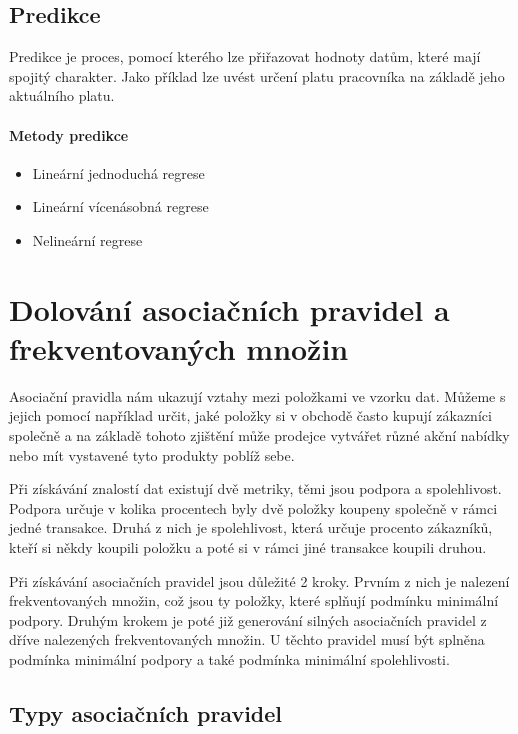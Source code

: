 \subsection{Predikce}
Predikce je proces, pomocí kterého lze přiřazovat hodnoty datům, které mají spojitý charakter. Jako příklad lze uvést určení platu pracovníka na základě jeho aktuálního platu. \cite[Kapitola~8]{Kamber}

\paragraph{Metody predikce} 

\begin{itemize}
  \item{Lineární jednoduchá regrese}
  \item{Lineární vícenásobná regrese}
  \item{Nelineární regrese}

\end{itemize}



\section{Dolování asociačních pravidel a frekventovaných množin}

Asociační pravidla nám ukazují vztahy mezi položkami ve vzorku dat. Můžeme s jejich pomocí například určit, jaké položky si v obchodě často kupují zákazníci společně a na základě tohoto zjištění může prodejce vytvářet různé akční nabídky nebo mít vystavené tyto produkty poblíž sebe.



Při získávání znalostí dat existují dvě metriky, těmi jsou podpora a spolehlivost. Podpora určuje v kolika procentech byly dvě položky koupeny společně v rámci jedné transakce. Druhá z nich je spolehlivost, která určuje procento zákazníků, kteří si někdy koupili položku a poté si v rámci jiné transakce koupili druhou.

Při získávání asociačních pravidel jsou důležité 2 kroky. Prvním z nich je nalezení frekventovaných množin, což jsou ty položky, které splňují podmínku minimální podpory. Druhým krokem je poté již generování silných asociačních pravidel z dříve nalezených frekventovaných množin. U těchto pravidel musí být splněna podmínka minimální podpory a také podmínka minimální spolehlivosti. \cite[Kapitola~6]{Kamber}

\subsection{Typy asociačních pravidel}

